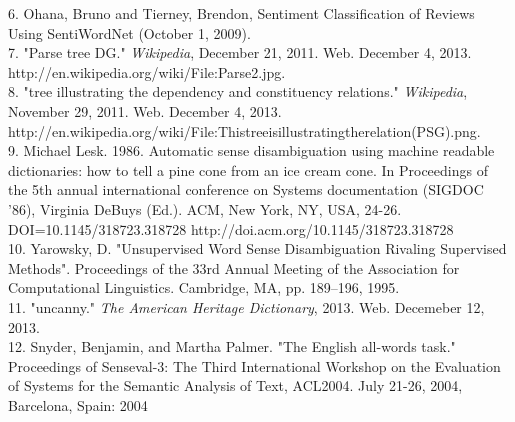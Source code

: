 \documentclass[pageno]{jpaper}
\begin{document}
6. Ohana, Bruno and Tierney, Brendon, Sentiment Classification of Reviews Using SentiWordNet (October 1, 2009). \\
7. "Parse tree DG." \textit{Wikipedia}, December 21, 2011. Web. December 4, 2013. http://en.wikipedia.org/wiki/File:Parse2.jpg. \\
8. "tree illustrating the dependency and constituency relations." \textit{Wikipedia}, November 29, 2011. Web. December 4, 2013. http://en.wikipedia.org/wiki/File:Thistreeisillustratingtherelation(PSG).png. \\
9. Michael Lesk. 1986. Automatic sense disambiguation using machine readable dictionaries: how to tell a pine cone from an ice cream cone. In Proceedings of the 5th annual international conference on Systems documentation (SIGDOC '86), Virginia DeBuys (Ed.). ACM, New York, NY, USA, 24-26. DOI=10.1145/318723.318728 http://doi.acm.org/10.1145/318723.318728 \\
10. Yarowsky, D. "Unsupervised Word Sense Disambiguation Rivaling Supervised Methods". 
Proceedings of the 33rd Annual Meeting of the Association for Computational Linguistics. 
Cambridge, MA, pp. 189–196, 1995. \\
11. "uncanny." \textit{The American Heritage Dictionary}, 2013. Web. Decemeber 12, 2013. \\
12. Snyder, Benjamin, and Martha Palmer. "The English all-words task." Proceedings of 
Senseval-3: The Third International Workshop on the Evaluation of Systems for the Semantic 
Analysis of Text, ACL2004. July 21-26, 2004, Barcelona, Spain: 2004  \\
\end{document}
